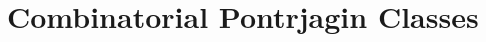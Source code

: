 \documentclass[../main]{subfiles}
\begin{document}
\chapter{Combinatorial Pontrjagin Classes}\label{ch:20}




\end{document}
